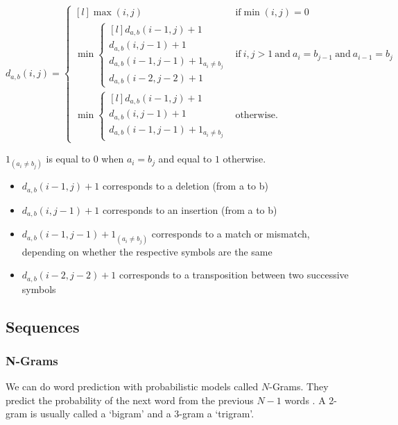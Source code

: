 \begin{equation}
  d_{a,b}(i,j)=\left\{\begin{matrix*}[l]
  \max(i,j) & \textrm{if}\min(i,j)=0\\
  \min\left\{\begin{matrix*}[l]
  d_{a,b}(i-1,j)+1\\
  d_{a,b}(i,j-1)+1\\
  d_{a,b}(i-1,j-1)+1_{a_i\neq b_j}\\
  d_{a,b}(i-2,j-2)+1
  \end{matrix*}\right. & \textrm{if}\ i,j > 1 \ \textrm{and}\ a_i = b_{j-1}\ \textrm{and}\ a_{i-1} = b_j\\
  \min\left\{\begin{matrix*}[l]
  d_{a,b}(i-1,j)+1\\
  d_{a,b}(i,j-1)+1\\
  d_{a,b}(i-1,j-1)+1_{a_i\neq b_j}
\end{matrix*}\right. & \textrm{otherwise.}
  \end{matrix*}\right.
  \label{eq:DL}
\end{equation}

$1_{(a_i \neq b_j)}$ is equal to $0$ when $a_i = b_j$ and equal to $1$ otherwise. 

\begin{itemize}
  \item $d_{a,b}(i-1,j) + 1$ corresponds to a deletion (from a to b)
  \item $d_{a,b}(i,j-1) + 1$ corresponds to an insertion (from a to b)
  \item $d_{a,b}(i-1,j-1) + 1_{(a_i \neq b_j)}$  corresponds to a match or mismatch, depending on whether the respective symbols are the same
  \item $d_{a,b}(i-2,j-2) + 1$  corresponds to a transposition between two successive symbols
\end{itemize}


\subsection{Sequences}


\subsubsection{N-Grams}
\label{s:ngrams}

We can do word prediction with probabilistic models called $N$-Grams. They predict the probability of the next word from the previous $N-1$ words \autocite{Jurafsky2009}. A 2-gram is usually called a `bigram' and a 3-gram a `trigram'.

